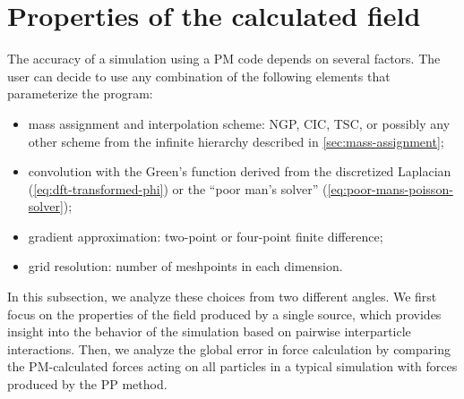 \section{Properties of the calculated field}
The accuracy of a simulation using a PM code depends on several factors.
The user can decide to use any combination of the following elements that parameterize the program:
\begin{itemize}
    \item mass assignment and interpolation scheme: NGP, CIC, TSC, or possibly any other scheme from the infinite hierarchy described in \autoref{sec:mass-assignment};
    \item convolution with the Green's function derived from the discretized Laplacian (\autoref{eq:dft-transformed-phi}) or the ``poor man's solver'' (\autoref{eq:poor-mans-poisson-solver});
    \item gradient approximation: two-point or four-point finite difference;
    \item grid resolution: number of meshpoints in each dimension.
\end{itemize}
In this subsection, we analyze these choices from two different angles.
We first focus on the properties of the field produced by a single source, which provides insight into the behavior of the simulation based on pairwise interparticle interactions.
Then, we analyze the global error in force calculation by comparing the PM-calculated forces acting on all particles in a typical simulation with forces produced by the PP method.

